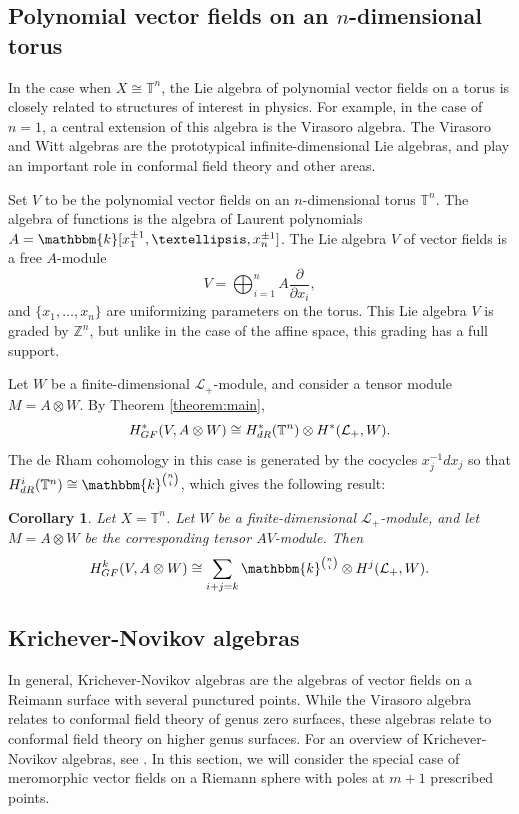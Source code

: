 \documentclass[12pt]{amsart}
\renewcommand{\k}{{\mathbbm{k}}}
\renewcommand{\L}{{\mathcal{L}}}
\newcommand{\T}{{\mathbb{T}}}
\newcommand{\Z}{{\mathbb{Z}}}
\newcommand{\DR}{{\textup{dR}}}
\newcommand{\GF}{{\textup{GF}}}
\newcommand{\dx}[1]{{\frac{\partial}{\partial x_{#1}}}}
\newtheorem{corollary}[theorem]{Corollary}
\theoremstyle{definition}
\begin{document}
\subsection{Polynomial vector fields on an $n$-dimensional torus}

In the case when $X \cong \T^n$, the Lie algebra of polynomial vector fields on a torus is closely related to structures of interest in physics. For example, in the case of $n=1$, a central extension of this algebra is the Virasoro algebra. The Virasoro and Witt algebras are the prototypical infinite-dimensional Lie algebras, and play an important role in conformal field theory and other areas. 

Set $V$ to be the polynomial vector fields on an $n$-dimensional torus $\T^n$. The algebra of functions is the algebra of Laurent polynomials $A =  \k [ x_1^{\pm 1}, \dots, x_n^{\pm 1} ]$. The Lie algebra $V$ of vector fields is a free $A$-module 
\[
V = \bigoplus_{i=1}^n A \dx{i},
\]
and $\{ x_1, \ldots, x_n\}$ are uniformizing parameters on the torus. 
This Lie algebra $V$ is graded by $\Z^n$, but unlike in the case of the affine space, this grading has a full support.

Let $W$ be a finite-dimensional $\L_+$-module, and consider a tensor module $M = A \otimes W$. By Theorem \ref{theorem:main},
\[
H_\GF^*(V, A \otimes W) \cong H_\DR^*(\T^n) \otimes H^*(\L_+, W).
\]
The de Rham cohomology in this case is generated by the cocycles $x_j^{-1}dx_j$ so that $H_\DR^i(\T^n) \cong \k^{\binom{n}{i}}$, which gives the following result:
\begin{corollary}
Let $X = \T^n$. Let $W$ be a finite-dimensional $\L_+$-module, and let $M = A \otimes W$ be the corresponding tensor $AV$-module. Then 
\[
H_\GF^k(V, A \otimes W) \cong \sum_{i+j =k} \k^{{n \choose i}} \otimes H^{j}(\L_+, W).
\]
\end{corollary}
\subsection{Krichever-Novikov algebras}

In general, Krichever-Novikov algebras are the algebras of vector fields on a Reimann surface with several punctured points. While the Virasoro algebra relates to conformal field theory of genus zero surfaces, these algebras relate to conformal field theory on higher genus surfaces. For an overview of Krichever-Novikov algebras, see \cite{Schlichenmaier2014}. In this section, we will consider the special case of meromorphic vector fields on a Riemann sphere with poles at $m+1$ prescribed points.
\end{document}
